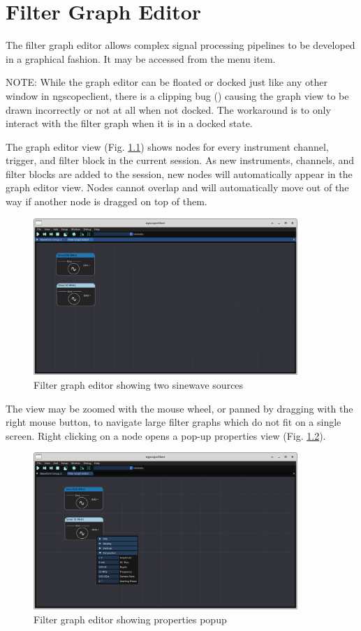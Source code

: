 \chapter{Filter Graph Editor}
\label{grapheditor}

The filter graph editor allows complex signal processing pipelines to be developed in a graphical fashion. It may be
accessed from the  menu item.

NOTE: While the graph editor can be floated or docked just like any other window in ngscopeclient, there is a clipping
bug () causing the graph view to be drawn incorrectly or not at all when not docked. The
workaround is to only interact with the filter graph when it is in a docked state.

The graph editor view (Fig. \ref{graph-editor}) shows nodes for every instrument channel, trigger, and filter block in
the current session. As new instruments, channels, and filter blocks are added to the session, new nodes will
automatically appear in the graph editor view. Nodes cannot overlap and will automatically move out of the way if
another node is dragged on top of them.

\begin{figure}[H]
\centering
\includegraphics[width=10cm]{ng-images/graph-editor.png}
\caption{Filter graph editor showing two sinewave sources}
\label{graph-editor}
\end{figure}

The view may be zoomed with the mouse wheel, or panned by dragging with the right mouse button, to navigate large
filter graphs which do not fit on a single screen. Right clicking on a node opens a pop-up properties view (Fig.
\ref{graph-editor-properties}).

\begin{figure}[H]
\centering
\includegraphics[width=10cm]{ng-images/graph-editor-properties.png}
\caption{Filter graph editor showing properties popup}
\label{graph-editor-properties}
\end{figure}

